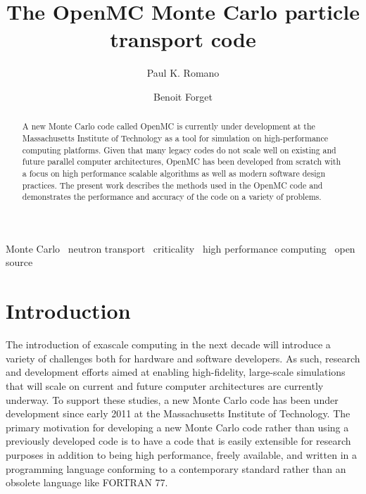 \documentclass[authoryear,preprint]{elsarticle}
\begin{document}
\begin{frontmatter}

\title{The OpenMC Monte Carlo particle transport code}
\author[mit]{Paul K. Romano}

\author[mit]{Benoit Forget}

\address[mit]{Massachusetts Institute of Technology, Department of Nuclear
  Science and Engineering, 77 Massachusetts Avenue, Building 24-607, Cambridge,
  MA 02139, United States}

\begin{abstract}
A new Monte Carlo code called OpenMC is currently under development at the
Massachusetts Institute of Technology as a tool for simulation on
high-performance computing platforms. Given that many legacy codes do not scale
well on existing and future parallel computer architectures, OpenMC has been
developed from scratch with a focus on high performance scalable algorithms as
well as modern software design practices. The present work describes the methods
used in the OpenMC code and demonstrates the performance and accuracy of the
code on a variety of problems.
\end{abstract}

\begin{keyword}
  Monte Carlo \ neutron transport \ criticality \ high performance computing
  \ open source
\end{keyword}

\end{frontmatter}

\section{Introduction}

The introduction of exascale computing in the next decade will introduce a
variety of challenges both for hardware and software developers. As such,
research and development efforts aimed at enabling high-fidelity, large-scale
simulations that will scale on current and future computer architectures are
currently underway. To support these studies, a new Monte Carlo code has been
under development since early 2011 at the Massachusetts Institute of
Technology. The primary motivation for developing a new Monte Carlo code rather
than using a previously developed code is to have a code that is easily
extensible for research purposes in addition to being high performance, freely
available, and written in a programming language conforming to a contemporary
standard rather than an obsolete language like FORTRAN 77.
\end{document}
